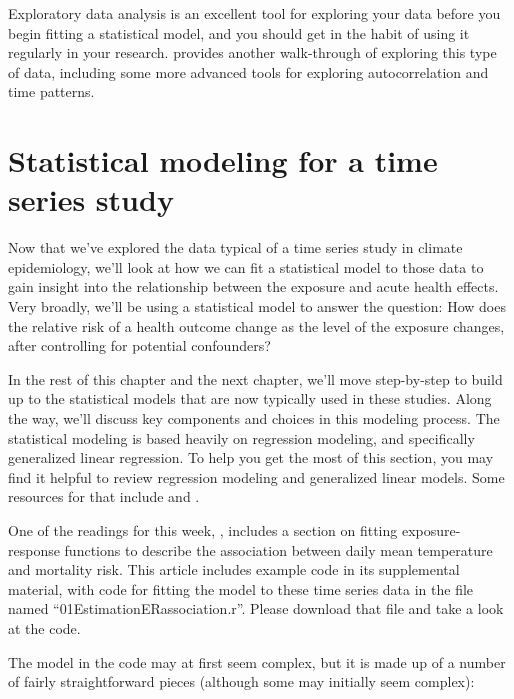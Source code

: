 \documentclass[
]{book}
\begin{document}
Exploratory data analysis is an excellent tool for exploring your data before
you begin fitting a statistical model, and you should get in the habit of using
it regularly in your research. \citet{dominici2008statistical5} provides another walk-through of exploring this type of data, including some more advanced tools
for exploring autocorrelation and time patterns.

\section{Statistical modeling for a time series study}\label{statistical-modeling-for-a-time-series-study}

Now that we've explored the data typical of a time series study in climate
epidemiology, we'll look at how we can fit a statistical model to those
data to gain insight into the relationship between the exposure and
acute health effects. Very broadly, we'll be using a statistical model to answer
the question: How does the relative risk of a health outcome change as
the level of the exposure changes, after controlling for potential confounders?

In the rest of this chapter and the next chapter, we'll
move step-by-step to build up to the statistical models that are now typically
used in these studies.
Along the way, we'll discuss key components and choices in this modeling process.
The statistical modeling is based heavily on regression modeling, and specifically
generalized linear regression. To help you get the most of this section, you
may find it helpful to review regression modeling and generalized linear models.
Some resources for that include \citet{dunn2018generalized1} and \citet{james2013introduction3} .

One of the readings for this week, \citet{vicedo2019hands}, includes a section
on fitting exposure-response functions to describe the association between
daily mean temperature and mortality risk. This article includes example
code in its supplemental material, with code for fitting the model to
these time series data in the file named ``01EstimationERassociation.r''.
Please download that file and take a look at the code.

The model in the code may at first seem complex, but it is made up of a number of
fairly straightforward pieces (although some may initially seem complex):
\end{document}
